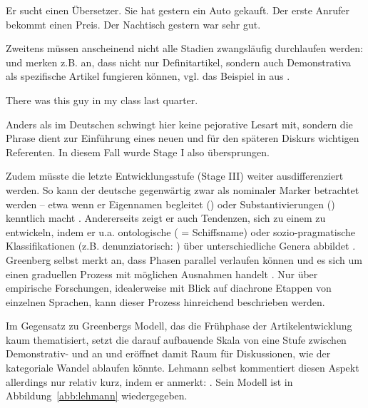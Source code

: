\begin{exe}
\settowidth{}
	\ex \label{ex:spez-ortho}   
	\begin{xlist}
		\ex \label{ex:kleid1} Er sucht einen Übersetzer.   
		\ex \label{ex:kleid2} Sie hat gestern ein Auto gekauft. 
		\ex \label{ex:stud1} Der erste Anrufer bekommt einen Preis. 
		\ex \label{ex:stud2} Der Nachtisch gestern war sehr gut. 
		\end{xlist}
\end{exe}

\noindent 
Zweitens müssen anscheinend nicht alle Stadien zwangsläufig durchlaufen werden: \textcite[107]{Himmelmann1997} und \textcite[139]{Diessel1999} merken z.B. an, dass nicht nur Definitartikel, sondern auch Demonstrativa  als spezifische  Artikel fungieren können, vgl. das Beispiel in  aus \textcite[533]{deMulder2011}. 
\begin{exe}
	\ex \label{ex:guy}   There was this guy in my class last quarter.
\end{exe}
\noindent 
Anders als im Deutschen schwingt hier keine pejorative Lesart mit, sondern die Phrase  dient zur Einführung eines neuen und für den späteren Diskurs wichtigen Referenten. In diesem Fall wurde Stage I also übersprungen. 

Zudem müsste die letzte Entwicklungsstufe (Stage III) weiter ausdifferenziert werden. So kann der deutsche  gegenwärtig zwar als nominaler Marker betrachtet werden -- etwa wenn er Eigennamen  begleitet () oder Substantivierungen  () kenntlich macht \parencite[71]{Szczepaniak2011a}. Andererseits zeigt er auch Tendenzen, sich zu einem  zu entwickeln, indem er u.a. ontologische ( = Schiffsname) oder sozio-pragmatische Klassifikationen (z.B. denunziatorisch: ) über unterschiedliche Genera  abbildet \parencite{Nubling2014}. Greenberg selbst merkt an, dass Phasen parallel verlaufen können und es sich um einen graduellen Prozess mit möglichen Ausnahmen handelt \parencite[61]{Greenberg1978}. Nur über empirische Forschungen, idealerweise mit Blick auf diachrone Etappen von einzelnen Sprachen, kann dieser Prozess hinreichend beschrieben werden. 

Im Gegensatz zu Greenbergs Modell, das die Frühphase der Artikelentwicklung kaum thematisiert, setzt die darauf aufbauende Skala  von \textcite{Lehmann2015} eine Stufe zwischen  Demonstrativ-  und  an und eröffnet damit Raum für Diskussionen, wie der kategoriale Wandel ablaufen könnte. Lehmann selbst kommentiert diesen Aspekt allerdings nur relativ kurz, indem er anmerkt: \parencite[41]{Lehmann2015}. Sein Modell ist in Abbildung~\ref{abb:lehmann} wiedergegeben. 

